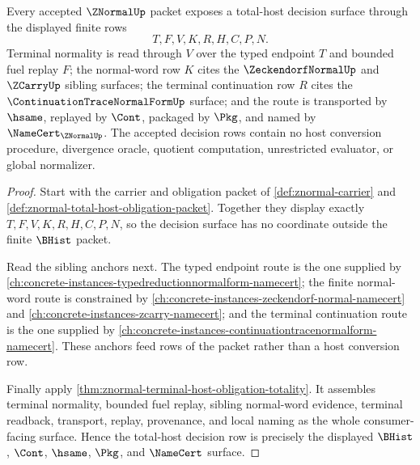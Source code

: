 \begin{theorem}
\label{thm:znormal-total-host-decision-surface}
Every accepted $\ZNormalUp$ packet exposes a total-host decision surface through the displayed finite rows
$$
T,F,V,K,R,H,C,P,N.
$$
Terminal normality is read through $V$ over the typed endpoint $T$ and bounded fuel replay $F$; the normal-word row $K$ cites the $\ZeckendorfNormalUp$ and $\ZCarryUp$ sibling surfaces; the terminal continuation row $R$ cites the $\ContinuationTraceNormalFormUp$ surface; and the route is transported by $\hsame$, replayed by $\Cont$, packaged by $\Pkg$, and named by $\NameCert_{\ZNormalUp}$. The accepted decision rows contain no host conversion procedure, divergence oracle, quotient computation, unrestricted evaluator, or global normalizer.
\end{theorem}
\begin{proof}
Start with the carrier and obligation packet of \autoref{def:znormal-carrier} and \autoref{def:znormal-total-host-obligation-packet}. Together they display exactly $T,F,V,K,R,H,C,P,N$, so the decision surface has no coordinate outside the finite $\BHist$ packet.

Read the sibling anchors next. The typed endpoint route is the one supplied by \autoref{ch:concrete-instances-typedreductionnormalform-namecert}; the finite normal-word route is constrained by \autoref{ch:concrete-instances-zeckendorf-normal-namecert} and \autoref{ch:concrete-instances-zcarry-namecert}; and the terminal continuation route is the one supplied by \autoref{ch:concrete-instances-continuationtracenormalform-namecert}. These anchors feed rows of the packet rather than a host conversion row.

Finally apply \autoref{thm:znormal-terminal-host-obligation-totality}. It assembles terminal normality, bounded fuel replay, sibling normal-word evidence, terminal readback, transport, replay, provenance, and local naming as the whole consumer-facing surface. Hence the total-host decision row is precisely the displayed $\BHist$, $\Cont$, $\hsame$, $\Pkg$, and $\NameCert$ surface.
\end{proof}

